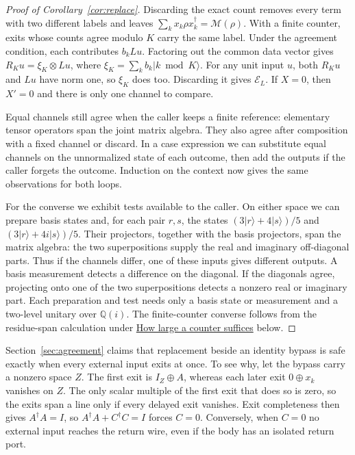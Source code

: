 \documentclass[acmsmall,screen,review,anonymous,nonacm]{acmart}
\newcommand{\ket}[1]{\lvert #1\rangle}
\numberwithin{equation}{section}
\newcommand{\chan}[1]{\mathcal E_{#1}}
\newcommand{\meas}{\mathcal M}
\begin{document}
\begin{proof}[Proof of Corollary~\ref{cor:replace}]
\setlength{\parindent}{\appendixindent}
Discarding the exact count removes every term with two different
labels and leaves $\sum_k x_k\rho x_k^\dagger=\meas(\rho)$. With a
finite counter, exits whose counts agree modulo $K$ carry the same
label. Under the agreement condition, each contributes $b_kLu$.
Factoring out the common data vector gives $R_Ku=\xi_K\otimes Lu$,
where $\xi_K=\sum_k b_k\ket{k\bmod K}$. For any unit input $u$, both $R_Ku$
and $Lu$ have norm one, so $\xi_K$ does too. Discarding it gives
$\chan L$. If $X=0$, then $X'=0$ and there is only one channel to compare.

Equal channels still agree when the caller keeps a finite reference:
elementary tensor operators span the joint matrix algebra. They also
agree after composition with a fixed channel or discard. In a case
expression we can substitute equal channels on the unnormalized state
of each outcome, then add the outputs if the caller forgets the outcome.
Induction on the context now gives the same observations for both loops.

For the converse we exhibit tests available to the caller. On either
space we can prepare basis states and, for each pair $r,s$, the states
$(3\ket r+4\ket s)/5$ and $(3\ket r+4i\ket s)/5$. Their projectors,
together with the basis projectors, span the matrix algebra: the two
superpositions supply the real and imaginary off-diagonal parts.
Thus if the channels differ, one of these inputs gives different
outputs. A basis measurement detects a difference on the diagonal.
If the diagonals agree, projecting onto one of the two superpositions
detects a nonzero real or imaginary part. Each preparation and test
needs only a basis state or measurement and a two-level unitary over
$\mathbb Q(i)$. The finite-counter converse follows from the residue-span
calculation under \hyperref[app:counter-size]{How large a counter suffices} below.
\end{proof}

Section~\ref{sec:agreement} claims that replacement beside an identity bypass
is safe exactly when every external input exits at once. To see why, let the
bypass carry a nonzero space $Z$. The first exit is $I_Z\oplus A$, whereas
each later exit $0\oplus x_k$ vanishes on $Z$. The only scalar multiple of the
first exit that does so is zero, so the exits span a line only if every delayed
exit vanishes. Exit completeness then
gives $A^\dagger A=I$, so $A^\dagger A+C^\dagger C=I$ forces $C=0$.
Conversely, when $C=0$ no external input reaches the return wire, even if the
body has an isolated return port.
\end{document}

